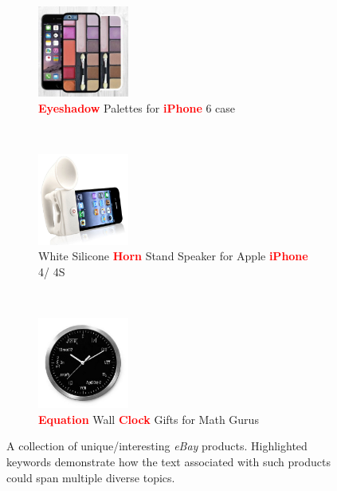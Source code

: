 \documentclass{article} %
\begin{document}
\begin{figure}
\label{fig:ebay-products}
        \centering
         \begin{subfigure}[b]{0.3\textwidth}
        	        \centering
                \includegraphics[width=30mm]{figures/eyeshadow-iphone-case.jpg}
                \caption{\textcolor{red}{{\bf Eyeshadow}} Palettes for \textcolor{red}{{\bf iPhone}} 6 case}
                \label{fig:eyeshadow-iphone-case}
        \end{subfigure}
              ~ %
        \begin{subfigure}[b]{0.3\textwidth}
		 \centering
                \includegraphics[width=30mm]{figures/horn-iphone-speaker.jpg}
\caption{White Silicone \textcolor{red}{{\bf Horn}} Stand Speaker for Apple \textcolor{red}{{\bf iPhone}} 4/ 4S}                \label{fig:zeppelin-speaker}
        \end{subfigure}
       ~ %
        \begin{subfigure}[b]{0.3\textwidth}
		 \centering
                \includegraphics[width=30mm]{figures/geeky-clock.jpg}
\caption{\textcolor{red}{{\bf Equation}} Wall \textcolor{red}{{\bf Clock}} Gifts for Math Gurus}                \label{fig:geeky-clock}
        \end{subfigure}
       \caption{A collection of unique/interesting {\em eBay} products. Highlighted keywords demonstrate how the text associated with such products could span multiple diverse topics.}
       \label{fig:ebay-products}
\end{figure}
\end{document}
